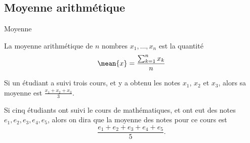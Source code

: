 \documentclass[french,xcolor=svgnames]{beamer}
\begin{document}

\subsection{Moyenne arithmétique}
\begin{frame}{Moyenne}
  \begin{definition}
    La moyenne arithmétique de \(n\) nombres \(x_{1}, \ldots, x_{n}\)\pause{} est la quantité\pause{}
    \begin{equation*}
      \mean{x} = \frac{\sum_{k=1}^{n} x_{k}}{n}
    \end{equation*}
  \end{definition}
  \pause
  \begin{example}
    Si un étudiant a suivi trois cours,\pause{} et y a obtenu les notes \(x_{1}\), \(x_{2}\) et \(x_{3}\)\pause{}, alors sa moyenne est \(\frac{x_{1} + x_{2} + x_{3}}{3}\).\pause{}
  \end{example}
  \begin{example}
    Si cinq étudiants ont suivi le cours de mathématiques,\pause{} et ont eut des notes \(e_{1}, e_{2}, e_{3}, e_{4}, e_{5}\),\pause{} alors on dira que la moyenne des notes pour ce cours est\pause{}
    \begin{equation*}
      \frac{e_{1} + e_{2} + e_{3} + e_{4} + e_{5}}{5}.
    \end{equation*}
  \end{example}
\end{frame}
\end{document}
